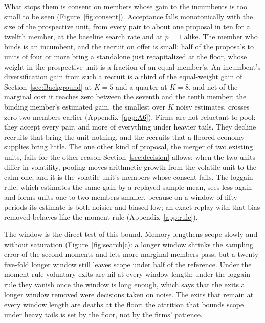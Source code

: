 What stops them is consent on members whose gain to the incumbents is too small to be seen (Figure~\ref{fig:consent}). Acceptance falls monotonically with the size of the prospective unit, from every pair to about one proposal in ten for a twelfth member, at the baseline search rate and at $p = 1$ alike. The member who binds is an incumbent, and the recruit on offer is small: half of the proposals to units of four or more bring a standalone just recapitalized at the floor, whose weight in the prospective unit is a fraction of an equal member's. An incumbent's diversification gain from such a recruit is a third of the equal-weight gain of Section~\ref{sec:Background} at $K = 5$ and a quarter at $K = 8$, and net of the marginal cost it reaches zero between the seventh and the tenth member; the binding member's estimated gain, the smallest over $K$ noisy estimates, crosses zero two members earlier (Appendix~\ref{app:A6}). Firms are not reluctant to pool: they accept every pair, and more of everything under heavier tails. They decline recruits that bring the unit nothing, and the recruits that a floored economy supplies bring little. The one other kind of proposal, the merger of two existing units, fails for the other reason Section~\ref{sec:decision} allows: when the two units differ in volatility, pooling moves arithmetic growth from the volatile unit to the calm one, and it is the volatile unit's members whose consent fails. The loggain rule, which estimates the same gain by a replayed sample mean, sees less again and forms units one to two members smaller, because on a window of fifty periods its estimate is both noisier and biased low; an exact replay with that bias removed behaves like the moment rule (Appendix~\ref{app:rule}).



The window is the direct test of this bound. Memory lengthens scope slowly and without saturation (Figure~\ref{fig:search}c): a longer window shrinks the sampling error of the second moments and lets more marginal members pass, but a twenty-five-fold longer window still leaves scope under half of the reference. Under the moment rule voluntary exits are nil at every window length; under the loggain rule they vanish once the window is long enough, which says that the exits a longer window removed were decisions taken on noise. The exits that remain at every window length are deaths at the floor: the attrition that bounds scope under heavy tails is set by the floor, not by the firms' patience.

